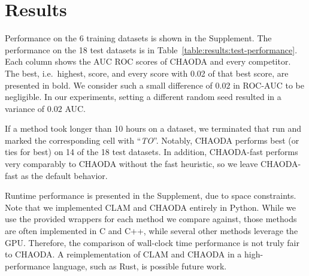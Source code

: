 \section{Results}
\label{sec:results}

Performance on the 6 training datasets is shown in the Supplement.
The performance on the 18 test datasets is in Table~\ref{table:results:test-performance}.
Each column shows the AUC ROC scores of CHAODA and every competitor.
The best, i.e.\ highest, score, and every score with 0.02 of that best score, are presented in bold.
We consider such a small difference of $0.02$ in ROC-AUC to be negligible.
In our experiments, setting a different random seed resulted in a variance of $0.02$ AUC.

If a method took longer than 10 hours on a dataset, we terminated that run and marked the corresponding cell with ``\textit{TO}''.
Notably, CHAODA performs best (or ties for best) on 14 of the 18 test datasets.
In addition, CHAODA-fast performs very comparably to CHAODA without the fast heuristic, so we leave CHAODA-fast as the default behavior.

Runtime performance is presented in the Supplement, due to space constraints. 
Note that we implemented CLAM and CHAODA entirely in Python.
While we use the provided wrappers for each method we compare against, those methods are often implemented in C and C++, while several other methods leverage the GPU.
Therefore, the comparison of wall-clock time performance is not truly fair to CHAODA.
A reimplementation of CLAM and CHAODA in a high-performance language, such as Rust, is possible future work.




